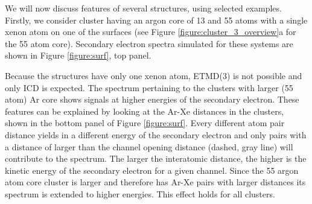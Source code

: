 We will now discuss features of several structures, using selected examples.
Firstly, we consider cluster having an argon core of 13 and 55 atoms with a single xenon
atom on one of the surfaces (see Figure \ref{figure:cluster_3_overview}a
for the 55 atom core).
Secondary electron spectra simulated for these systems are shown in Figure \ref{figure:surf}, top panel.


Because the structures have only one xenon atom, ETMD(3) is not possible
and only ICD is expected. 
The spectrum pertaining to the clusters with larger (55 atom) Ar core shows
signals at higher energies of the secondary electron. These features
can be explained by looking at the Ar-Xe distances in the clusters, shown
in the bottom panel of Figure \ref{figure:surf}. 
Every different atom pair distance
yields in a different energy of the secondary electron and only pairs
with a distance of larger than the channel opening distance
(dashed, gray line) will contribute
to the spectrum. 
The larger the interatomic distance, the higher is the
kinetic energy of the secondary electron for a given channel.
Since the 55 argon atom core cluster is larger and therefore
has Ar-Xe pairs with larger distances its spectrum is extended to
higher energies.
This effect holds for all clusters.

